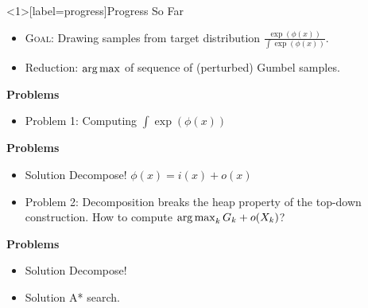\begin{frame}<1>[label=progress]{Progress So Far}
  \begin{itemize}[<+->]
  \item \textsc{Goal}: Drawing samples from target distribution $\frac{\exp(\phi(x))}{\int \exp(\phi(x))}$.
  \item Reduction: $\operatorname*{{arg\,max}}$ of sequence of (perturbed) Gumbel samples.
  \end{itemize}
  \begin{overprint}

    \textbf{Problems}
    \begin{itemize}
    \item {\color{red}Problem 1:} Computing $\int \exp(\phi(x))$        %
    \end{itemize}

    \textbf{Problems}
    \begin{itemize} 
    \item {\color{blue} Solution} Decompose! $\phi(x) = i(x) + o(x)$%
    \item {\color{red} Problem 2:} Decomposition breaks the heap property of the top-down construction. How to compute $\operatorname*{{arg\,max}}_k G_k + o(X_k)$? %
    \end{itemize}

    \textbf{Problems}
    \begin{itemize} 
    \item {\color{blue} Solution} Decompose! %
    \item {\color{blue} Solution} A* search.
    \end{itemize}
  \end{overprint}
\end{frame}

